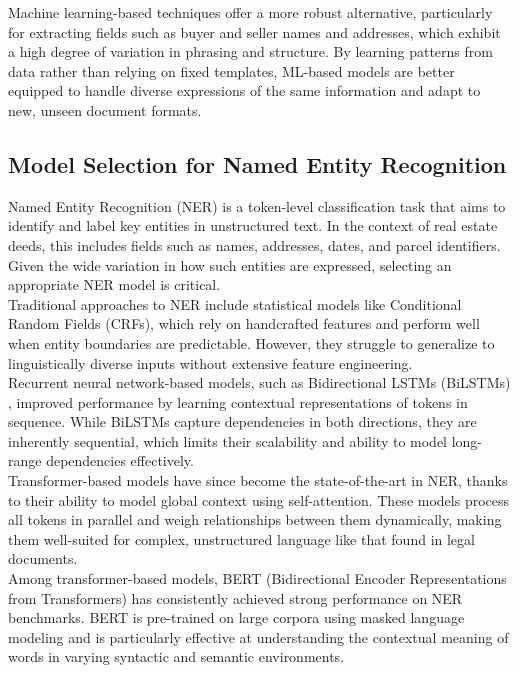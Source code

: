 \documentclass{article}
\begin{document}
Machine learning-based techniques offer a more robust alternative, particularly for extracting fields such as buyer and seller names and addresses, which exhibit a high degree of variation in phrasing and structure. By learning patterns from data rather than relying on fixed templates, ML-based models are better equipped to handle diverse expressions of the same information and adapt to new, unseen document formats.


\subsection{Model Selection for Named Entity Recognition}

Named Entity Recognition (NER) is a token-level classification task that aims to identify and label key entities in unstructured text. In the context of real estate deeds, this includes fields such as names, addresses, dates, and parcel identifiers. Given the wide variation in how such entities are expressed, selecting an appropriate NER model is critical. \\

Traditional approaches to NER include statistical models like Conditional Random Fields (CRFs), \cite{lafferty2001conditional} which rely on handcrafted features and perform well when entity boundaries are predictable. However, they struggle to generalize to linguistically diverse inputs without extensive feature engineering. \\

Recurrent neural network-based models, such as Bidirectional LSTMs (BiLSTMs) \cite{huang2015bidirectional}, improved performance by learning contextual representations of tokens in sequence. While BiLSTMs capture dependencies in both directions, they are inherently sequential, which limits their scalability and ability to model long-range dependencies effectively. \\

Transformer-based models have since become the state-of-the-art in NER, thanks to their ability to model global context using self-attention. These models process all tokens in parallel and weigh relationships between them dynamically, making them well-suited for complex, unstructured language like that found in legal documents. \\

Among transformer-based models, BERT (Bidirectional Encoder Representations from Transformers) \cite{devlin2018bert} has consistently achieved strong performance on NER benchmarks. BERT is pre-trained on large corpora using masked language modeling and is particularly effective at understanding the contextual meaning of words in varying syntactic and semantic environments. \\
\end{document}

